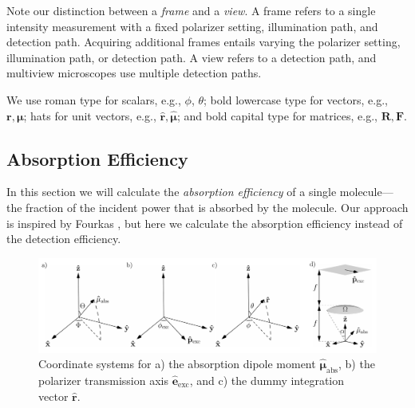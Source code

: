 \documentclass[10pt]{article}
\providecommand{\mb}[1]{\mathbf{#1}}
\providecommand{\mh}[1]{\mathbf{\hat{#1}}}
\providecommand{\bs}[1]{\boldsymbol{#1}}
\begin{document}
Note our distinction between a \emph{frame} and a \emph{view}. A frame refers to
a single intensity measurement with a fixed polarizer setting, illumination
path, and detection path. Acquiring additional frames entails varying the
polarizer setting, illumination path, or detection path. A view refers to a
detection path, and multiview microscopes use multiple detection paths.

We use roman type for scalars, e.g., $\phi$, $\theta$; bold lowercase type for
vectors, e.g., $\mb{r}, \bs{\mu}$; hats for unit vectors, e.g.,
$\mh{r}, \hat{\bs{\mu}}$; and bold capital type for matrices, e.g.,
$\mb{R}, \mb{F}$.

\subsection{Absorption Efficiency}\label{excitation}
In this section we will calculate the \emph{absorption efficiency} of a single
molecule---the fraction of the incident power that is absorbed by the
molecule. Our approach is inspired by Fourkas \cite{fourkas2001}, but here we
calculate the absorption efficiency instead of the detection efficiency.

\begin{figure}[H]
\centering\includegraphics[width=\textwidth]{frames}
\caption{Coordinate systems for a) the absorption dipole moment
  $\hat{\bs{\mu}}_{\text{abs}}$, b) the polarizer transmission axis
  $\hat{\mb{e}}_{\text{exc}}$, and c) the dummy integration vector
  $\hat{\mb{r}}$.}
\label{fig:coordinates}
\end{figure}
\end{document}
